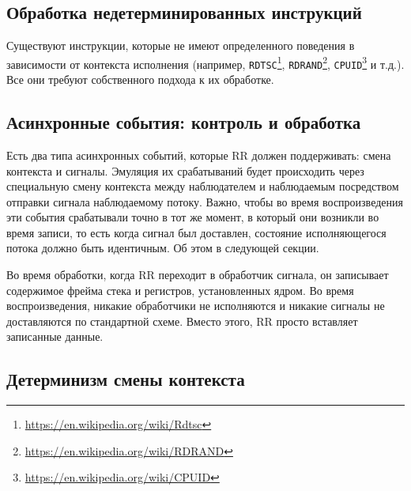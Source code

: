 
\subsection{Обработка недетерминированных инструкций}

Существуют инструкции, которые не имеют определенного поведения в зависимости от контекста исполнения 
(например, 
\texttt{RDTSC}\footnote{\url{https://en.wikipedia.org/wiki/Rdtsc}}, 
\texttt{RDRAND}\footnote{\url{https://en.wikipedia.org/wiki/RDRAND}}, 
\texttt{CPUID}\footnote{\url{https://en.wikipedia.org/wiki/CPUID}} и т.д.). Все они требуют собственного подхода к их обработке.


\subsection{Асинхронные события: контроль и обработка}

Есть два типа асинхронных событий, которые RR должен поддерживать: смена контекста и сигналы.
Эмуляция их срабатываний будет происходить через специальную смену контекста между наблюдателем и наблюдаемым посредством отправки 
сигнала наблюдаемому потоку. Важно, чтобы во время воспроизведения эти события срабатывали точно в тот же момент, 
в который они возникли во время записи, то есть когда сигнал был доставлен, состояние исполняющегося потока должно быть идентичным.
Об этом в следующей секции.

Во время обработки, когда RR переходит в обработчик сигнала, он записывает содержимое фрейма стека и регистров, установленных ядром. 
Во время воспроизведения, никакие обработчики не исполняются и никакие сигналы не доставляются по стандартной схеме. 
Вместо этого, RR просто вставляет записанные данные.

\subsection{Детерминизм смены контекста}

